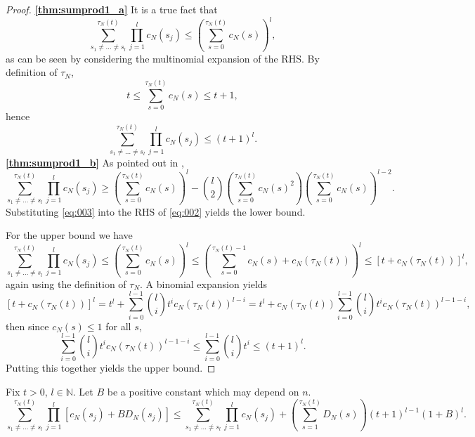 \documentclass{article}
\newcommand{\1}[1]{\mathbbm{1}_{#1}}
\begin{document}
\begin{proof} \textbf{\ref{thm:sumprod1_a}}
It is a true fact that
\begin{equation}\label{eq:005}
\sum_{s_1\neq\dots\neq s_l}^{\tau_N(t)} \prod_{j=1}^l c_N(s_j)
\leq \left( \sum_{s=0}^{\tau_N(t)} c_N(s) \right)^l ,
\end{equation}
as can be seen by considering the multinomial expansion of the RHS.
By definition of $\tau_N$, 
\begin{equation}\label{eq:003}
t 
\leq \sum_{s=0}^{\tau_N(t)} c_N(s) 
\leq t+1 ,
\end{equation}
hence
\begin{equation}
\sum_{s_1\neq\dots\neq s_l}^{\tau_N(t)} \prod_{j=1}^l c_N(s_j)
\leq (t+1)^l .
\end{equation}
\textbf{\ref{thm:sumprod1_b}}
As pointed out in \citet[Equation (8)]{koskela2018}, 
\begin{equation}\label{eq:002}
\sum_{s_1\neq\dots\neq s_l}^{\tau_N(t)} \prod_{j=1}^l c_N(s_j)
\geq \left( \sum_{s=0}^{\tau_N(t)} c_N(s) \right)^l
        - \binom{l}{2} \left( \sum_{s=0}^{\tau_N(t)} c_N(s)^2 \right)
        \left( \sum_{s=0}^{\tau_N(t)} c_N(s) \right)^{l-2} .
\end{equation}
Substituting \eqref{eq:003} into the RHS of \eqref{eq:002} yields the lower bound.

For the upper bound we have
\begin{equation}
\sum_{s_1\neq\dots\neq s_l}^{\tau_N(t)} \prod_{j=1}^l c_N(s_j)
\leq \left( \sum_{s=0}^{\tau_N(t)} c_N(s) \right)^l
\leq \left( \sum_{s=0}^{\tau_N(t) -1} c_N(s) + c_N(\tau_N(t)) \right)^l
\leq \left[ t + c_N(\tau_N(t)) \right]^l ,
\end{equation}
again using the definition of $\tau_N$.
A binomial expansion yields
\begin{equation}
\left[ t + c_N(\tau_N(t)) \right]^l
= t^l + \sum_{i=0}^{l-1} \binom{l}{i} t^i c_N(\tau_N(t))^{l-i}
= t^l + c_N(\tau_N(t)) \sum_{i=0}^{l-1} \binom{l}{i} t^i c_N(\tau_N(t))^{l-1-i} ,
\end{equation}
then since $c_N(s) \leq 1$ for all $s$,
\begin{equation}
\sum_{i=0}^{l-1} \binom{l}{i} t^i c_N(\tau_N(t))^{l-1-i}
\leq \sum_{i=0}^{l-1} \binom{l}{i} t^i
\leq (t+1)^l .
\end{equation}
Putting this together yields the upper bound.
\end{proof}


\begin{lemma}\label{thm:sumprod2}
Fix $t>0$, $l\in\mathbb{N}$.
Let $B$ be a positive constant which may depend on $n$.
\begin{equation}
\sum_{s_1\neq\dots\neq s_l}^{\tau_N(t)} \prod_{j=1}^l 
        \left[ c_N(s_j) + B D_N(s_j) \right]
\leq \sum_{s_1\neq\dots\neq s_l}^{\tau_N(t)} \prod_{j=1}^l c_N(s_j)
        + \left( \sum_{s=1}^{\tau_N(t)} D_N(s) \right) (t+1)^{l-1} (1+B)^l .
\end{equation}
\end{lemma}
\end{document}
